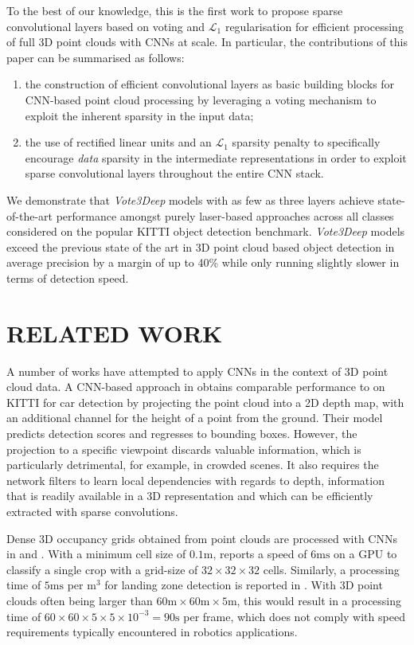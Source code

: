 \documentclass[letterpaper, 10 pt, conference]{tex_style/ieeeconf}
\begin{document}
To the best of our knowledge, this is the first work to propose sparse convolutional layers based on voting and $\mathcal{L}_1$ regularisation for efficient processing of full 3D point clouds with CNNs at scale.
In particular, the contributions of this paper can be summarised as follows:
\begin{enumerate}
\item the construction of efficient convolutional layers as basic building blocks for CNN-based point cloud processing by leveraging a voting mechanism to exploit the inherent sparsity in the input data;
\item the use of rectified linear units and an $\mathcal{L}_1$ sparsity penalty to specifically encourage \emph{data} sparsity in the intermediate representations in order to exploit sparse convolutional layers throughout the entire CNN stack.
\end{enumerate}

We demonstrate that \emph{Vote3Deep} models with as few as three layers achieve state-of-the-art performance amongst purely laser-based approaches across all classes considered on the popular KITTI object detection benchmark.
\emph{Vote3Deep} models exceed the previous state of the art in 3D point cloud based object detection in average precision by a margin of up to 40\% while only running slightly slower in terms of detection speed.

 \section{RELATED WORK}
\label{sec:related}

A number of works have attempted to apply CNNs in the context of 3D point cloud data.
A CNN-based approach in \cite{livehicle} obtains comparable performance to \cite{wang2015voting} on KITTI for car detection by projecting the point cloud into a 2D depth map, with an additional channel for the height of a point from the ground.
Their model predicts detection scores and regresses to bounding boxes.
However, the projection to a specific viewpoint discards valuable information, which is particularly detrimental, for example, in crowded scenes.
It also requires the network filters to learn local dependencies with regards to depth, information that is readily available in a 3D representation and which can be efficiently extracted with sparse convolutions.





Dense 3D occupancy grids obtained from point clouds are processed with CNNs in \cite{maturana2015voxnet} and \cite{maturana20153d}.
With a minimum cell size of $0.1\mathrm{m}$, \cite{maturana2015voxnet} reports a speed of $6\mathrm{ms}$ on a GPU to classify a single crop with a grid-size of $32 \times 32 \times 32$ cells.
Similarly, a processing time of $5\mathrm{ms}$ per $\mathrm{m}^3$ for landing zone detection is reported in \cite{maturana20153d}.
With 3D point clouds often being larger than $60\mathrm{m} \times 60\mathrm{m} \times 5\mathrm{m}$, this would result in a processing time of $60 \times 60 \times 5 \times 5 \times 10^{-3} = 90\mathrm{s}$ per frame, which does not comply with speed requirements typically encountered in robotics applications.
\end{document}
